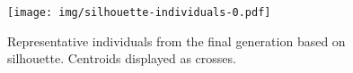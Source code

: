 \begin{figure}[htbp]
    \centering
    \texttt{[image: img/silhouette-individuals-0.pdf]}
    \caption{Representative individuals from the final generation based on
             silhouette. Centroids displayed as
             crosses.}\label{figure:silhouette-individuals}
\end{figure}



